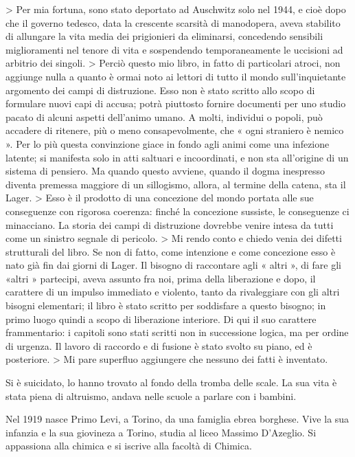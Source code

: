 > Per mia fortuna, sono stato deportato ad Auschwitz solo nel 1944, e cioè dopo che il governo tedesco, data la crescente scarsità di manodopera, aveva stabilito di allungare la vita media dei prigionieri da eliminarsi, concedendo sensibili miglioramenti nel tenore di vita e sospendendo temporaneamente le uccisioni ad arbitrio dei singoli.
> Perciò questo mio libro, in fatto di particolari atroci, non aggiunge nulla a quanto è ormai noto ai lettori di tutto il mondo sull'inquietante argomento dei campi di distruzione. Esso non è stato scritto allo scopo di formulare nuovi capi di accusa; potrà piuttosto fornire documenti per uno studio pacato di alcuni aspetti dell'animo umano. A molti, individui o popoli, può accadere di ritenere, più o meno consapevolmente, che « ogni straniero è nemico ». Per lo più questa convinzione giace in fondo agli animi come una infezione latente; si manifesta solo in atti saltuari e incoordinati, e non sta all'origine di un sistema di pensiero. Ma quando questo avviene, quando il dogma inespresso diventa premessa maggiore di un sillogismo, allora, al termine della catena, sta il Lager.
> Esso è il prodotto di una concezione del mondo portata alle sue conseguenze con rigorosa coerenza: finché la concezione sussiste, le conseguenze ci minacciano. La storia dei campi di distruzione dovrebbe venire intesa da tutti come un sinistro segnale di pericolo.
> Mi rendo conto e chiedo venia dei difetti strutturali del libro. Se non di fatto, come intenzione e come concezione esso è nato già fin dai giorni di Lager. Il bisogno di raccontare agli « altri », di fare gli «altri » partecipi, aveva assunto fra noi, prima della liberazione e dopo, il carattere di un impulso immediato e violento, tanto da rivaleggiare con gli altri bisogni elementari; il libro è stato scritto per soddisfare a questo bisogno; in primo luogo quindi a scopo di liberazione interiore. Di qui il suo carattere frammentario: i capitoli sono stati scritti non in successione logica, ma per ordine di urgenza. Il lavoro di raccordo e di fusione è stato svolto su piano, ed è posteriore.
> Mi pare superfluo aggiungere che nessuno dei fatti è inventato.

Si è suicidato, lo hanno trovato al fondo della tromba delle scale. La sua vita è stata piena di altruismo, andava nelle scuole a parlare con i bambini.

Nel 1919 nasce Primo Levi, a Torino, da una famiglia ebrea borghese. Vive la sua infanzia e la sua giovineza a Torino, studia al liceo Massimo D'Azeglio. Si appassiona alla chimica e si iscrive alla facoltà di Chimica.

